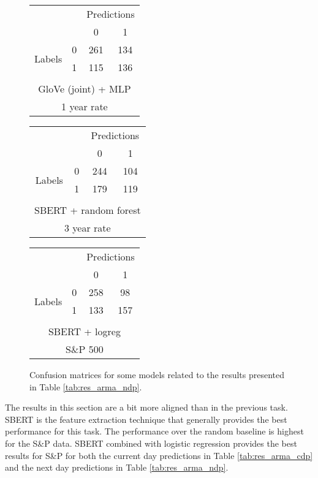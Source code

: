 \begin{figure}[h]
    \centering
    \begin{tabular}{cccc}
     & & \multicolumn{2}{c}{Predictions} \\
     & & \multicolumn{1}{|c|}{0} & \multicolumn{1}{c|}{1}\\
      \cline{2-4}
     \multirow{2}{*}{Labels} & 0 & \multicolumn{1}{|c|}{261} &  \multicolumn{1}{c|}{134} \\
      & 1 & \multicolumn{1}{|c|}{115} & \multicolumn{1}{c|}{136} \\ 
      \\ \multicolumn{4}{c}{GloVe (joint) + MLP} \\
      \multicolumn{4}{c}{1 year rate}
\end{tabular} \hspace{1em}
\begin{tabular}{cccc}
     & & \multicolumn{2}{c}{Predictions} \\
     & & \multicolumn{1}{|c|}{0} & \multicolumn{1}{c|}{1}\\
      \cline{2-4}
     \multirow{2}{*}{Labels} & 0 & \multicolumn{1}{|c|}{244} &  \multicolumn{1}{c|}{104} \\
      & 1 & \multicolumn{1}{|c|}{179} & \multicolumn{1}{c|}{119} \\ 
      \\ \multicolumn{4}{c}{SBERT + random forest} \\
      \multicolumn{4}{c}{3 year rate}
\end{tabular} \hspace{1em}
\begin{tabular}{cccc}
     & & \multicolumn{2}{c}{Predictions} \\
     & & \multicolumn{1}{|c|}{0} & \multicolumn{1}{c|}{1} \\
      \cline{2-4}
     \multirow{2}{*}{Labels} & 0 & \multicolumn{1}{|c|}{258} &  \multicolumn{1}{c|}{98} \\
      & 1 & \multicolumn{1}{|c|}{133} & \multicolumn{1}{c|}{157} \\ 
      \\ \multicolumn{4}{c}{SBERT + logreg} \\
      \multicolumn{4}{c}{S\&P 500}
\end{tabular}
    \caption{Confusion matrices for some models related to the results presented in Table \ref{tab:res_arma_ndp}.}
    \label{tab:confmat_arma_ndp}
\end{figure}

The results in this section are a bit more aligned than in the previous task. SBERT is the feature extraction technique that generally provides the best performance for this task. The performance over the random baseline is highest for the S\&P data. SBERT combined with logistic regression provides the best results for S\&P for both the current day predictions in Table \ref{tab:res_arma_cdp} and the next day predictions in Table \ref{tab:res_arma_ndp}. 




